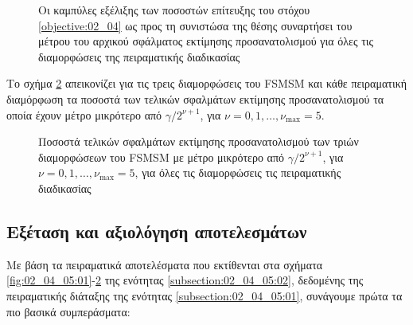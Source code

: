 \begin{figure}[!h]\centering
  \vspace{2cm}
  
  \vspace{1.5cm}
  \caption{\small Οι καμπύλες εξέλιξης των ποσοστών επίτευξης του στόχου
           \ref{objective:02_04} ως προς τη συνιστώσα της θέσης συναρτήσει του
           μέτρου του αρχικού σφάλματος εκτίμησης προσανατολισμού για όλες τις
           διαμορφώσεις της πειραματικής διαδικασίας}
  \label{fig:02_04_05:12}
\end{figure}

Το σχήμα \ref{fig:02_04_05:13} απεικονίζει για τις τρεις διαμορφώσεις του FSMSM
και κάθε πειραματική διαμόρφωση τα ποσοστά των τελικών σφαλμάτων εκτίμησης
προσανατολισμού τα οποία έχουν μέτρο μικρότερο από $\gamma / 2^{\nu+1}$, για
$\nu = 0,1,\dots,\nu_{\max} = 5$.

\begin{figure}[!h]\centering
  
  \vspace{-0.5cm}
  \caption{\small Ποσοστά τελικών σφαλμάτων εκτίμησης προσανατολισμού των
           τριών διαμορφώσεων του FSMSM με μέτρο μικρότερο από $\gamma /
           2^{\nu+1}$, για $\nu = 0,1,\dots,\nu_{\max} = 5$, για όλες τις
           διαμορφώσεις τις πειραματικής διαδικασίας}
  \label{fig:02_04_05:13}
\end{figure}




\subsection{Εξέταση και αξιολόγηση αποτελεσμάτων}
\label{subsection:02_04_05:03}

Με βάση τα πειραματικά αποτελέσματα που εκτίθενται στα σχήματα
\ref{fig:02_04_05:01}-\ref{fig:02_04_05:13} της ενότητας
\ref{subsection:02_04_05:02}, δεδομένης της πειραματικής διάταξης της ενότητας
\ref{subsection:02_04_05:01}, συνάγουμε πρώτα τα πιο βασικά συμπεράσματα:

